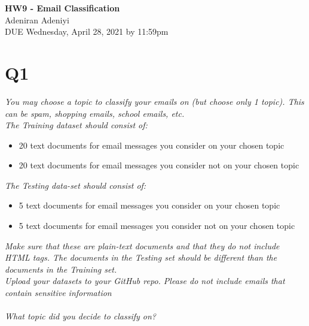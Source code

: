 \documentclass[12pt]{article}
\begin{document}
\begin{centering}
{\large\textbf{HW9 - Email Classification}}\\ %
Adeniran Adeniyi\\                     %
DUE Wednesday, April 28, 2021 by 11:59pm\\                      %
\end{centering}



\section*{Q1}
\emph{You may choose a topic to classify your emails on (but choose only 1 topic). This can be spam, shopping emails, school emails, etc.\\
The Training dataset should consist of:}
\begin{itemize}
    \item 20 text documents for email messages you consider on your chosen topic
    \item 20 text documents for email messages you consider not on your chosen topic
    
\end{itemize}
\emph{The Testing data-set should consist of:}
\begin{itemize}
    \item 5 text documents for email messages you consider on your chosen topic
    \item 5 text documents for email messages you consider not on your chosen topic
\end{itemize}
\emph{Make sure that these are plain-text documents and that they do not include HTML tags. The documents in the Testing set should be different than the documents in the Training set.\\
Upload your datasets to your GitHub repo. Please do not include emails that contain sensitive information
\\ \\What topic did you decide to classify on?}
\end{document}
